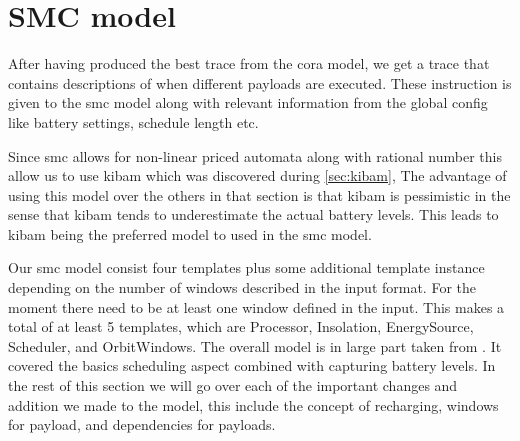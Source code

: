 \section{SMC model} \label{sec:smc_model}
After having produced the best trace from the \gls{cora} model, we get a trace that contains descriptions of when different payloads are executed. These instruction is given to the \gls{smc} model along with relevant information from the global config like battery settings, schedule length etc.

Since \gls{smc} allows for non-linear priced automata along with rational number this allow us to use \gls{kibam} which was discovered during \cref{sec:kibam}, The advantage of using this model over the others in that section is that \gls{kibam} is pessimistic in the sense that \gls{kibam} tends to underestimate the actual battery levels. This leads to \gls{kibam} being the preferred model to used in the \gls{smc} model.

Our \gls{smc} model consist four templates plus some additional template instance depending on the number of windows described in the input format. For the moment there need to be at least one window defined in the input. This makes a total of at least 5 templates, which are Processor, Insolation, EnergySource, Scheduler, and OrbitWindows. 
The overall model is in large part taken from \cite{battery_aware_scheduling}. It covered the basics scheduling aspect combined with capturing battery levels. In the rest of this section we will go over each of the important changes and addition we made to the model, this include the concept of recharging, windows for payload, and dependencies for payloads. 

